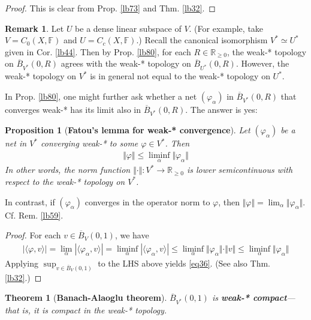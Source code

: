\documentclass[12pt,b5paper,notitlepage]{article}
\theoremstyle{definition}
\newtheorem{rem}[df]{Remark}
\theoremstyle{plain}
\newtheorem{thm}[df]{Theorem}
\newtheorem{pp}[df]{Proposition}
\newcommand{\ovl}{\overline}
\newcommand{\bk}[1]{\langle {#1}\rangle}
\newcommand{\Rbb}{\mathbb R}
\newcommand{\Fbb}{\mathbb F}
\numberwithin{equation}{section}
\begin{document}
\begin{proof}
This is clear from Prop. \ref{lb73} and  Thm. \ref{lb32}.
\end{proof}


\begin{rem}\label{lb96}
Let $U$ be a dense linear subspace of $V$. (For example, take $V=C_0(X,\Fbb)$ and $U=C_c(X,\Fbb)$.) Recall the canonical isomorphism $V^*\simeq U^*$ given in Cor. \ref{lb44}. Then by Prop. \ref{lb80}, for each $R\in\Rbb_{\geq0}$, the weak-* topology on $\ovl B_{V^*}(0,R)$ agrees with the weak-* topology on $\ovl B_{U^*}(0,R)$. However, the weak-* topology on $V^*$ is in general not equal to the weak-* topology on $U^*$. 
\end{rem}



In Prop. \ref{lb80}, one might further ask whether a net $(\varphi_\alpha)$ in $\ovl B_{V^*}(0,R)$ that converges weak-* has its limit also in $\ovl B_{V^*}(0,R)$. The answer is yes:

\begin{pp}[\textbf{Fatou's lemma for weak-* convergence}]\label{lb106}
Let $(\varphi_\alpha)$ be a net in $V^*$ converging weak-* to some $\varphi\in V^*$. Then
\begin{align}\label{eq36}
\Vert\varphi\Vert\leq\liminf_\alpha\Vert\varphi_\alpha\Vert
\end{align}
In other words, the norm function $\Vert\cdot\Vert:V^*\rightarrow\Rbb_{\geq0}$ is lower semicontinuous with respect to the weak-* topology on $V^*$.
\end{pp}


In contrast, if $(\varphi_\alpha)$ converges in the operator norm to $\varphi$, then $\Vert\varphi\Vert=\lim_\alpha\Vert\varphi_\alpha\Vert$. Cf. Rem. \ref{lb59}.


\begin{proof}
For each $v\in\ovl B_V(0,1)$, we have
\begin{align*}
|\bk{\varphi,v}|=\lim_\alpha |\bk{\varphi_\alpha,v}|=\liminf_\alpha |\bk{\varphi_\alpha,v}|\leq\liminf_\alpha\Vert\varphi_\alpha\Vert\cdot\Vert v\Vert\leq\liminf_\alpha\Vert\varphi_\alpha\Vert
\end{align*}
Applying $\sup_{v\in\ovl B_V(0,1)}$ to the LHS above yields \eqref{eq36}. (See also Thm. \ref{lb32}.)
\end{proof}



\begin{thm}[\textbf{Banach-Alaoglu theorem}]\label{lb60}
$\ovl B_{V^*}(0,1)$ is \textbf{weak-* compact}---that is, it is compact in the weak-* topology. 
\end{thm}
\end{document}
